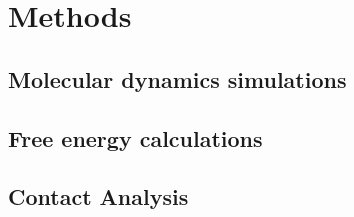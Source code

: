 \chapter{Methods}
\section{Molecular dynamics simulations}

\section{Free energy calculations}

\section{Contact Analysis}
